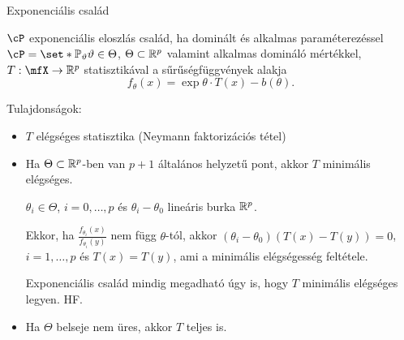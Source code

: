 \documentclass[aspectratio=169,notheorems,9pt,\option]{beamer}
\begin{document}
  \begin{frame}{Exponenciális család}
    \begin{df}
      $\cP$ exponenciális eloszlás család, ha dominált és alkalmas paraméterezéssel 
      $\cP=\set*{\P[\theta]}{\theta\in\Theta}$, $\Theta\subset\mathbb{R}^p$ 
      valamint alkalmas domináló mértékkel, $T:\mfX\to\real^p$ statisztikával 
      a sűrűségfüggvények alakja 
      \begin{displaymath}
        f_{\theta} (x) =\exp{\theta\cdot T(x)-b (\theta)}.\tag{*}
      \end{displaymath}
    \end{df}
    \continue
    Tulajdonságok:
    \begin{itemize}
    \item $T$ elégséges statisztika (Neymann faktorizációs tétel)
    \item 
    Ha $\Theta\subset\mathbb{R}^p$-ben van $p+1$ általános helyzetű pont, akkor $T$ minimális elégséges.
  
    $\theta_i\in\Theta$, $i=0,\dots,p$ és $\theta_i-\theta_0$ lineáris burka $\mathbb{R}^p$.  
    
    Ekkor, ha $\frac{f_{\theta_i}(x)}{f_{\theta_i}(y)}$ nem függ $\theta$-tól, 
    akkor $(\theta_i-\theta_0)(T(x)-T(y))=0$, 
    $i=1,\dots,p$ és $T(x)=T(y)$, ami a minimális elégségesség feltétele.
  
    Exponenciális család mindig megadható úgy is, hogy $T$ minimális elégséges legyen. HF.
    
  
    \item Ha $\Theta$ belseje nem üres, akkor $T$ teljes is.
    
    \end{itemize}
  \end{frame}
  
\end{document}
